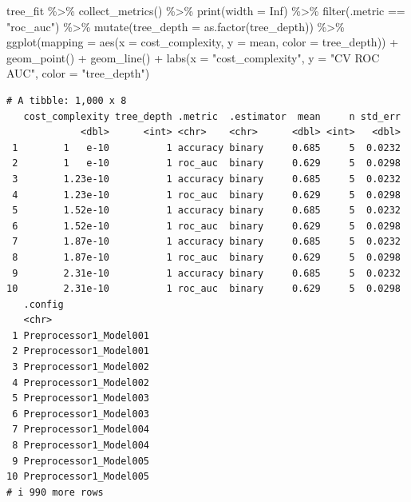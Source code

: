 \documentclass[
]{article}
\newenvironment{Shaded}{\begin{snugshade}}{\end{snugshade}}
\newcommand{\AttributeTok}[1]{\textcolor[rgb]{0.40,0.45,0.13}{#1}}
\newcommand{\ConstantTok}[1]{\textcolor[rgb]{0.56,0.35,0.01}{#1}}
\newcommand{\FunctionTok}[1]{\textcolor[rgb]{0.28,0.35,0.67}{#1}}
\newcommand{\NormalTok}[1]{\textcolor[rgb]{0.00,0.23,0.31}{#1}}
\newcommand{\SpecialCharTok}[1]{\textcolor[rgb]{0.37,0.37,0.37}{#1}}
\newcommand{\StringTok}[1]{\textcolor[rgb]{0.13,0.47,0.30}{#1}}
\begin{document}
\begin{Shaded}
\begin{Highlighting}[]
\NormalTok{tree\_fit }\SpecialCharTok{\%\textgreater{}\%}
  \FunctionTok{collect\_metrics}\NormalTok{() }\SpecialCharTok{\%\textgreater{}\%}
  \FunctionTok{print}\NormalTok{(}\AttributeTok{width =} \ConstantTok{Inf}\NormalTok{) }\SpecialCharTok{\%\textgreater{}\%}
  \FunctionTok{filter}\NormalTok{(.metric }\SpecialCharTok{==} \StringTok{"roc\_auc"}\NormalTok{) }\SpecialCharTok{\%\textgreater{}\%}
  \FunctionTok{mutate}\NormalTok{(}\AttributeTok{tree\_depth =} \FunctionTok{as.factor}\NormalTok{(tree\_depth)) }\SpecialCharTok{\%\textgreater{}\%}
  \FunctionTok{ggplot}\NormalTok{(}\AttributeTok{mapping =} \FunctionTok{aes}\NormalTok{(}\AttributeTok{x =}\NormalTok{ cost\_complexity, }\AttributeTok{y =}\NormalTok{ mean, }\AttributeTok{color =}\NormalTok{ tree\_depth)) }\SpecialCharTok{+}
  \FunctionTok{geom\_point}\NormalTok{() }\SpecialCharTok{+} 
  \FunctionTok{geom\_line}\NormalTok{() }\SpecialCharTok{+} 
  \FunctionTok{labs}\NormalTok{(}\AttributeTok{x =} \StringTok{"cost\_complexity"}\NormalTok{, }\AttributeTok{y =} \StringTok{"CV ROC AUC"}\NormalTok{, }\AttributeTok{color =} \StringTok{"tree\_depth"}\NormalTok{) }
\end{Highlighting}
\end{Shaded}

\begin{verbatim}
# A tibble: 1,000 x 8
   cost_complexity tree_depth .metric  .estimator  mean     n std_err
             <dbl>      <int> <chr>    <chr>      <dbl> <int>   <dbl>
 1        1   e-10          1 accuracy binary     0.685     5  0.0232
 2        1   e-10          1 roc_auc  binary     0.629     5  0.0298
 3        1.23e-10          1 accuracy binary     0.685     5  0.0232
 4        1.23e-10          1 roc_auc  binary     0.629     5  0.0298
 5        1.52e-10          1 accuracy binary     0.685     5  0.0232
 6        1.52e-10          1 roc_auc  binary     0.629     5  0.0298
 7        1.87e-10          1 accuracy binary     0.685     5  0.0232
 8        1.87e-10          1 roc_auc  binary     0.629     5  0.0298
 9        2.31e-10          1 accuracy binary     0.685     5  0.0232
10        2.31e-10          1 roc_auc  binary     0.629     5  0.0298
   .config               
   <chr>                 
 1 Preprocessor1_Model001
 2 Preprocessor1_Model001
 3 Preprocessor1_Model002
 4 Preprocessor1_Model002
 5 Preprocessor1_Model003
 6 Preprocessor1_Model003
 7 Preprocessor1_Model004
 8 Preprocessor1_Model004
 9 Preprocessor1_Model005
10 Preprocessor1_Model005
# i 990 more rows
\end{verbatim}
\end{document}
